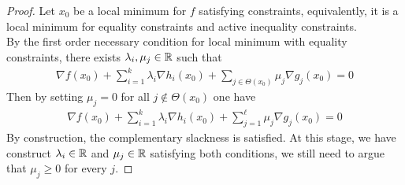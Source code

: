 \documentclass{article}
\begin{document}
   	\begin{proof}
   		Let $x_0$ be a local minimum for $f$ satisfying constraints, equivalently, it is a local minimum for equality constraints and active inequality constraints. \\
   		By the first order necessary condition for local minimum with equality constraints, there exists $\lambda_i, \mu_j \in \mathbb{R}$ such that
   		\begin{align}
   			\nabla f(x_0) + \sum_{i=1}^k \lambda_i \nabla h_i(x_0) + \sum_{j \in \Theta(x_0)} \mu_j \nabla g_j(x_0) = 0
   		\end{align}
   		Then by setting $\mu_j = 0$ for all $j \notin \Theta(x_0)$ one have
   		\begin{align}
   			\nabla f(x_0) + \sum_{i=1}^k \lambda_i \nabla h_i(x_0) + \sum_{j=1}^\ell \mu_j \nabla g_j(x_0) = 0
   		\end{align}
   		By construction, the complementary slackness is satisfied. At this stage, we have construct $\lambda_i \in \mathbb{R}$ and $\mu_j \in \mathbb{R}$ satisfying both conditions, we still need to argue that $\mu_j \geq 0$ for every $j$.
   	\end{proof}
   	
\end{document}
